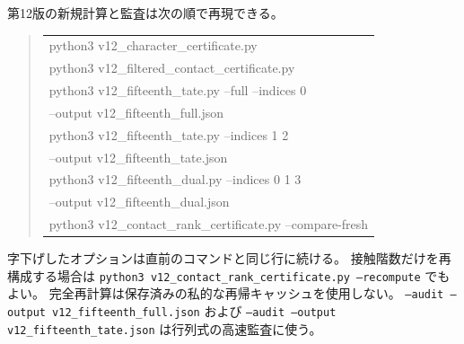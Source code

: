 第12版の新規計算と監査は次の順で再現できる。
\begin{quote}\footnotesize\ttfamily
\begin{tabular}{@{}l@{}}
python3 v12\_character\_certificate.py\\
python3 v12\_filtered\_contact\_certificate.py\\
python3 v12\_fifteenth\_tate.py --full --indices 0\\
\quad --output v12\_fifteenth\_full.json\\
python3 v12\_fifteenth\_tate.py --indices 1 2\\
\quad --output v12\_fifteenth\_tate.json\\
python3 v12\_fifteenth\_dual.py --indices 0 1 3\\
\quad --output v12\_fifteenth\_dual.json\\
python3 v12\_contact\_rank\_certificate.py --compare-fresh\\
\end{tabular}
\end{quote}
字下げしたオプションは直前のコマンドと同じ行に続ける。
接触階数だけを再構成する場合は
\texttt{python3 v12\_contact\_rank\_certificate.py --recompute} でもよい。
完全再計算は保存済みの私的な再帰キャッシュを使用しない。
\texttt{--audit --output v12\_fifteenth\_full.json} および
\texttt{--audit --output v12\_fifteenth\_tate.json} は行列式の高速監査に使う。

